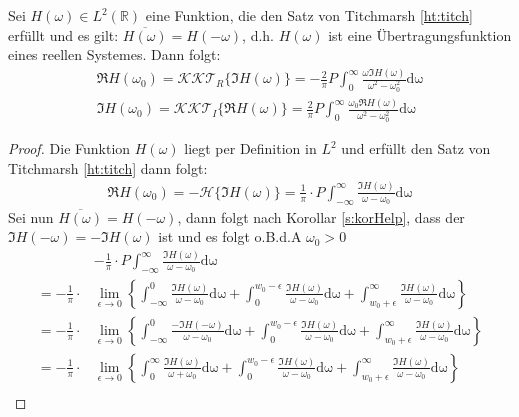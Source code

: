 \begin{satz}\label{kkt}
Sei $H(\omega) \in L^2(\mathbb{R})$ eine Funktion, die den Satz von Titchmarsh \ref{ht:titch} erfüllt und es gilt: $\overline{H(\omega)} = H(-\omega)$, d.h. $H(\omega)$ ist eine Übertragungsfunktion eines reellen Systemes. Dann folgt:
\begin{align}
	\Re{H(\omega_0)} = \mathscr{KKT}_R \{\Im{H(\omega)}\} = -\frac{2}{\pi} P \int_0^{\infty} \frac{\omega \Im{H(\omega)}}{\omega^2 - \omega^2_0} \mathrm{d\omega}\label{kkt:Re}\\
	\Im{H(\omega_0)} = \mathscr{KKT}_I \{\Re{H(\omega)}\} = \frac{2}{\pi} P \int_0^{\infty} \frac{\omega_0 \Re{H(\omega)}}{\omega^2 - \omega^2_0} \mathrm{d\omega}\label{kkt:Im}
\end{align}
\begin{proof}
Die Funktion $H(\omega)$ liegt per Definition in $L^2$ und erfüllt den Satz von Titchmarsh \ref{ht:titch} dann folgt:
\begin{align}
	\Re{H(\omega_0)} =-\mathscr{H}\{\Im{H(\omega)}\}= \frac{1}{\pi}\cdot P \int_{-\infty}^{\infty} \frac{\Im{H(\omega)}}{\omega-\omega_0} \mathrm{d\omega}
\end{align}
Sei nun $\overline{H(\omega)} = H(-\omega)$, dann folgt nach Korollar \ref{s:korHelp}, dass der $\Im{H(-\omega)} = -\Im{H(\omega)}$ ist und es folgt o.B.d.A $\omega_0 > 0$
\begin{align}
		&-\frac{1}{\pi}\cdot P \int_{-\infty}^{\infty} \frac{\Im{H(\omega)}}{\omega-\omega_0} \mathrm{d\omega} \\
		= -\frac{1}{\pi} \cdot &\lim_{\epsilon \rightarrow 0} \left\{ \int_{-\infty}^{0} \frac{\Im{H(\omega)}}{\omega-\omega_0} \mathrm{d\omega} + \int_{0}^{w_0-\epsilon} \frac{\Im{H(\omega)}}{\omega-\omega_0} \mathrm{d\omega} + \int_{w_0 + \epsilon}^{\infty} \frac{\Im{H(\omega)}}{\omega-\omega_0} \mathrm{d\omega} \right\}\\
		= -\frac{1}{\pi} \cdot &\lim_{\epsilon \rightarrow 0} \left\{ \int_{-\infty}^{0} \frac{-\Im{H(-\omega)}}{\omega-\omega_0} \mathrm{d\omega} + \int_{0}^{w_0-\epsilon} \frac{\Im{H(\omega)}}{\omega-\omega_0} \mathrm{d\omega} + \int_{w_0 + \epsilon}^{\infty} \frac{\Im{H(\omega)}}{\omega-\omega_0} \mathrm{d\omega} \right\}\\
		= -\frac{1}{\pi} \cdot &\lim_{\epsilon \rightarrow 0} \left\{ \int_{0}^{\infty} \frac{\Im{H(\omega)}}{\omega+\omega_0} \mathrm{d\omega} + \int_{0}^{w_0-\epsilon} \frac{\Im{H(\omega)}}{\omega-\omega_0} \mathrm{d\omega} + \int_{w_0 + \epsilon}^{\infty} \frac{\Im{H(\omega)}}{\omega-\omega_0} \mathrm{d\omega} \right\}\\

\end{align}
\end{proof}
\end{satz}
